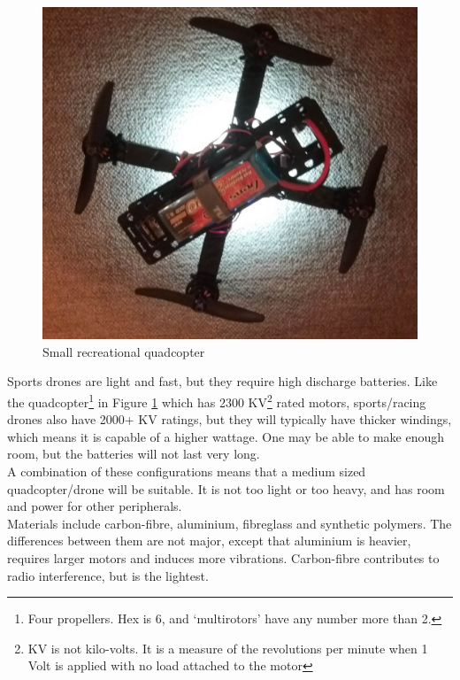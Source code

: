 \begin{figure}[H]
\centering
\includegraphics[scale=0.12]{images/small_quad.jpg}
\caption{Small recreational quadcopter}
\label{fig:small_quad}
\end{figure}

Sports drones are light and fast, but they require high discharge batteries. Like the quadcopter\footnote{Four propellers. Hex is 6, and `multirotors' have any number more than 2.} in Figure \ref{fig:small_quad} which has 2300 KV\footnote{KV is not kilo-volts. It is a measure of the revolutions per minute when 1 Volt is applied with no load attached to the motor} rated motors, sports/racing drones also have 2000+ KV ratings, but they will typically have thicker windings, which means it is capable of a higher wattage. One may be able to make enough room, but the batteries will not last very long.\\

A combination of these configurations means that a medium sized quadcopter/drone will be suitable. It is not too light or too heavy, and has room and power for other peripherals.\\

Materials include carbon-fibre, aluminium, fibreglass and synthetic polymers. The differences between them are not major, except that aluminium is heavier, requires larger motors and induces more vibrations. Carbon-fibre contributes to radio interference\cite{frame}, but is the lightest.\\

